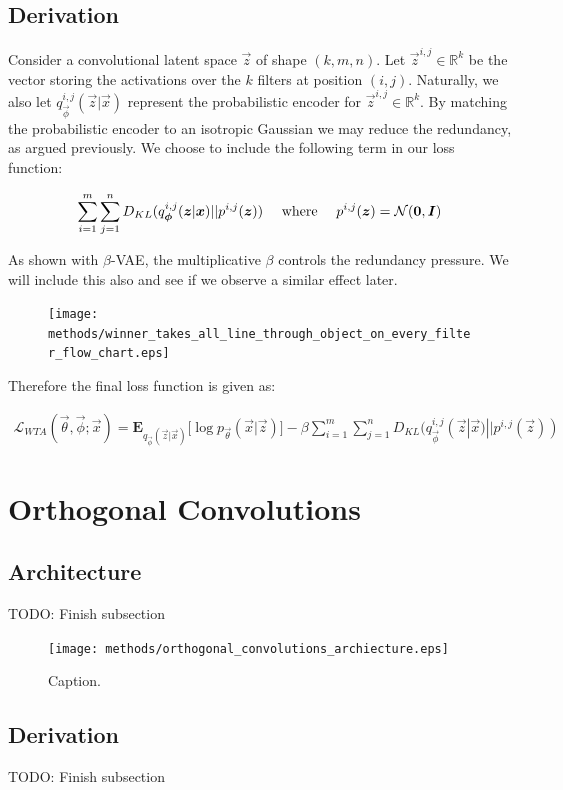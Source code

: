 \subsection{Derivation}

Consider a convolutional latent space $\vec{z}$ of shape $(k, m, n)$. Let $\vec{z}^{i,j} \in \mathbb{R}^k$ be the vector storing the activations over the $k$ filters at position $(i, j)$. Naturally, we also let $q_{\vec{\phi}}^{i, j}(\vec{z} | \vec{x})$ represent the probabilistic encoder for $\vec{z}^{i,j}\in \mathbb{R}^k$. By matching the probabilistic encoder to an isotropic Gaussian we may reduce the redundancy, as argued previously. We choose to include the following term in our loss function:

\begin{align}
\sum_{i=1}^m \sum_{j=1}^n D_{KL}(q_{\vec{\phi}}^{i, j}(\vec{z} | \vec{x}) || p^{i,j}(\vec{z}))  \quad \textup{ where } \quad p^{i,j}(\vec{z}) = \mathcal{N}(\vec{0}, \vec{I})
\end{align}

As shown with $\beta$-VAE, the multiplicative $\beta$ controls the redundancy pressure. We will include this also and see if we observe a similar effect later.

\begin{figure}[h!]
\centering
\captionsetup{justification=centering}
\texttt{[image: methods/winner\_takes\_all\_line\_through\_object\_on\_every\_filter\_flow\_chart.eps]}
\label{fig:winner_takes_all_line_through_object_on_every_filter}
\end{figure}

Therefore the final loss function is given as:

\begin{align}
\mathcal{L}_{WTA}(\vec{\theta}, \vec{\phi}; \vec{x}) = \mathbf{E}_{q_{\vec{\phi}}(\vec{z} | \vec{x})} \big[ \log p_{\vec{\theta}}(\vec{x} | \vec{z}) \big] - \beta \sum_{i=1}^m \sum_{j=1}^n D_{KL}(q_{\vec{\phi}}^{i, j}(\vec{z} | \vec{x}) || p^{i,j}(\vec{z})) 
\end{align}


%
%
%
%
%
\section{Orthogonal Convolutions}
\lipsum[2]
\subsection{Architecture}
TODO: Finish subsection
\begin{figure}[h!]
\centering
\captionsetup{justification=centering}
\texttt{[image: methods/orthogonal\_convolutions\_archiecture.eps]}
\caption{Caption.}
\label{fig:orthogonal_convolutions_archiecture}
\end{figure}

\subsection{Derivation}
TODO: Finish subsection